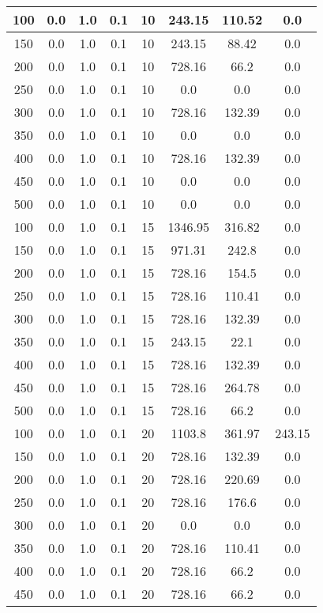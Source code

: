\documentclass[a4paper, 12pt]{extreport}
\begin{document}
\begin{itemize}
\begin{longtable}{|c|c|c|c|c|c|c|c|}
			100 & 0.0 & 1.0 & 0.1 & 10 & 243.15 & 110.52 & 0.0 \\\hline
			150 & 0.0 & 1.0 & 0.1 & 10 & 243.15 & 88.42 & 0.0 \\\hline
			200 & 0.0 & 1.0 & 0.1 & 10 & 728.16 & 66.2 & 0.0 \\\hline
			250 & 0.0 & 1.0 & 0.1 & 10 & 0.0 & 0.0 & 0.0 \\\hline
			300 & 0.0 & 1.0 & 0.1 & 10 & 728.16 & 132.39 & 0.0 \\\hline
			350 & 0.0 & 1.0 & 0.1 & 10 & 0.0 & 0.0 & 0.0 \\\hline
			400 & 0.0 & 1.0 & 0.1 & 10 & 728.16 & 132.39 & 0.0 \\\hline
			450 & 0.0 & 1.0 & 0.1 & 10 & 0.0 & 0.0 & 0.0 \\\hline
			500 & 0.0 & 1.0 & 0.1 & 10 & 0.0 & 0.0 & 0.0 \\\hline
			100 & 0.0 & 1.0 & 0.1 & 15 & 1346.95 & 316.82 & 0.0 \\\hline
			150 & 0.0 & 1.0 & 0.1 & 15 & 971.31 & 242.8 & 0.0 \\\hline
			200 & 0.0 & 1.0 & 0.1 & 15 & 728.16 & 154.5 & 0.0 \\\hline
			250 & 0.0 & 1.0 & 0.1 & 15 & 728.16 & 110.41 & 0.0 \\\hline
			300 & 0.0 & 1.0 & 0.1 & 15 & 728.16 & 132.39 & 0.0 \\\hline
			350 & 0.0 & 1.0 & 0.1 & 15 & 243.15 & 22.1 & 0.0 \\\hline
			400 & 0.0 & 1.0 & 0.1 & 15 & 728.16 & 132.39 & 0.0 \\\hline
			450 & 0.0 & 1.0 & 0.1 & 15 & 728.16 & 264.78 & 0.0 \\\hline
			500 & 0.0 & 1.0 & 0.1 & 15 & 728.16 & 66.2 & 0.0 \\\hline
			100 & 0.0 & 1.0 & 0.1 & 20 & 1103.8 & 361.97 & 243.15 \\\hline
			150 & 0.0 & 1.0 & 0.1 & 20 & 728.16 & 132.39 & 0.0 \\\hline
			200 & 0.0 & 1.0 & 0.1 & 20 & 728.16 & 220.69 & 0.0 \\\hline
			250 & 0.0 & 1.0 & 0.1 & 20 & 728.16 & 176.6 & 0.0 \\\hline
			300 & 0.0 & 1.0 & 0.1 & 20 & 0.0 & 0.0 & 0.0 \\\hline
			350 & 0.0 & 1.0 & 0.1 & 20 & 728.16 & 110.41 & 0.0 \\\hline
			400 & 0.0 & 1.0 & 0.1 & 20 & 728.16 & 66.2 & 0.0 \\\hline
			450 & 0.0 & 1.0 & 0.1 & 20 & 728.16 & 66.2 & 0.0 \\\hline

\end{longtable}
\end{itemize}
\end{document}
